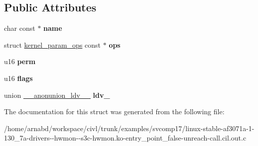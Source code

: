 \subsection*{Public Attributes}
\begin{DoxyCompactItemize}
\item 
\hypertarget{structkernel__param_a6b81e96fc3200a0f2ddcf4fdaaff5757}{}char const $\ast$ {\bfseries name}\label{structkernel__param_a6b81e96fc3200a0f2ddcf4fdaaff5757}

\item 
\hypertarget{structkernel__param_a78cc3232c973d34924bc4ae9543992fa}{}struct \hyperlink{structkernel__param__ops}{kernel\+\_\+param\+\_\+ops} const $\ast$ {\bfseries ops}\label{structkernel__param_a78cc3232c973d34924bc4ae9543992fa}

\item 
\hypertarget{structkernel__param_af5b9eb7f5b33b735d8c11e334df234af}{}u16 {\bfseries perm}\label{structkernel__param_af5b9eb7f5b33b735d8c11e334df234af}

\item 
\hypertarget{structkernel__param_aa0b6a36a2fe6e4597746298b5683ac17}{}u16 {\bfseries flags}\label{structkernel__param_aa0b6a36a2fe6e4597746298b5683ac17}

\item 
\hypertarget{structkernel__param_a0313d08ceee79c6b745c607d58f981a3}{}union \hyperlink{union____anonunion__ldv__6605__22}{\+\_\+\+\_\+anonunion\+\_\+ldv\+\_\+\_} {\bfseries ldv\+\_}\label{structkernel__param_a0313d08ceee79c6b745c607d58f981a3}

\end{DoxyCompactItemize}


The documentation for this struct was generated from the following file\+:\begin{DoxyCompactItemize}
\item 
/home/arnabd/workspace/civl/trunk/examples/svcomp17/linux-\/stable-\/af3071a-\/1-\/130\+\_\+7a-\/drivers-\/-\/hwmon-\/-\/s3c-\/hwmon.\+ko-\/entry\+\_\+point\+\_\+false-\/unreach-\/call.\+cil.\+out.\+c\end{DoxyCompactItemize}
